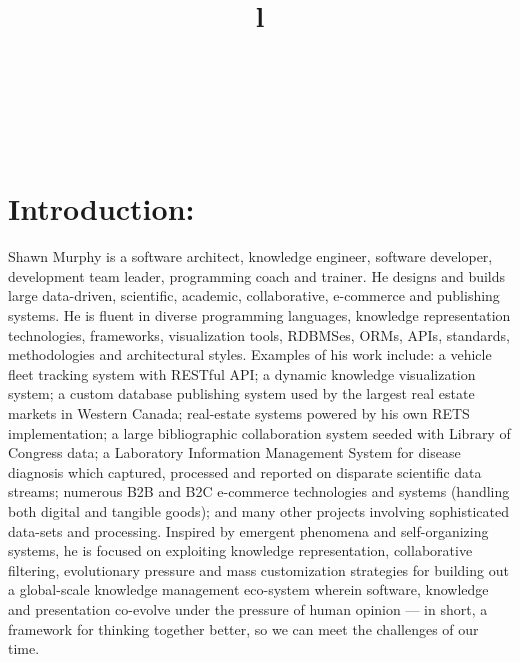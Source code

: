 \resumewidth=7in
\begin{resume}

\begin{format}
\title{l}\\
\\
\body\\
\end{format}


\section{Introduction:}
\begin{par}

Shawn Murphy is a software architect, knowledge engineer,
software developer, development team leader, programming coach
and trainer.
He designs and builds large data-driven, scientific, academic, 
collaborative, e-commerce and publishing systems. 
He is fluent in diverse programming languages, knowledge
representation technologies, frameworks, visualization tools, RDBMSes,
ORMs, APIs, standards, methodologies and architectural styles. 
Examples of his work include:  
  a vehicle fleet tracking system with RESTful API;
  a dynamic knowledge visualization system;
  a custom database publishing system used by the largest real estate
    markets in Western Canada;
  real-estate systems powered by his own RETS implementation; 
  a large bibliographic collaboration system seeded with Library of Congress data; 
  a Laboratory Information Management System for disease diagnosis which 
    captured, processed and reported on disparate scientific data streams; 
  numerous B2B and B2C e-commerce technologies and systems 
    (handling both digital and tangible goods);
  and many other projects involving sophisticated data-sets and processing. 
Inspired by emergent phenomena and
self-organizing systems, he is focused on exploiting knowledge
representation, collaborative filtering, evolutionary pressure and
mass customization strategies for building out a global-scale
knowledge management eco-system wherein software, knowledge and presentation
co-evolve under the pressure of human opinion --– in short, a framework for 
thinking together better, so we can meet the challenges of our time.

\end{par}






\end{resume}
